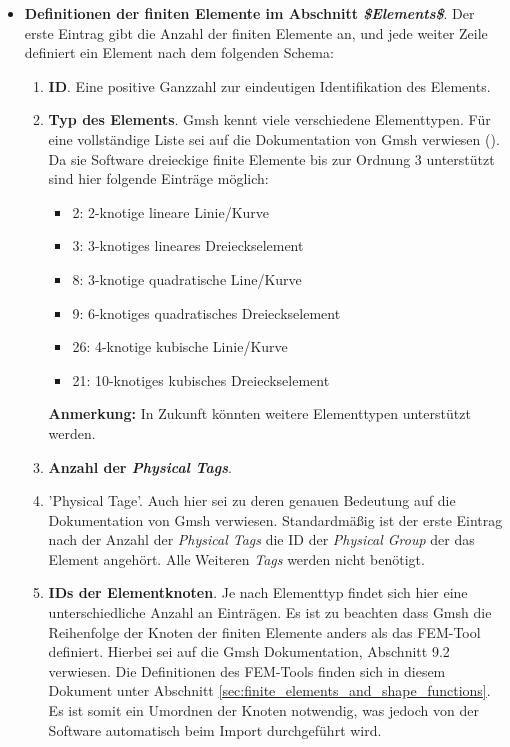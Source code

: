 \begin{itemize}
	\item \textbf{Definitionen der finiten Elemente im Abschnitt \textit{\$Elements\$}}. Der erste Eintrag gibt die Anzahl der finiten Elemente an, und jede weiter Zeile definiert ein Element nach dem folgenden Schema:
	\begin{enumerate}
		\item \textbf{ID}. Eine positive Ganzzahl zur eindeutigen Identifikation des Elements.
		\item \textbf{Typ des Elements}. Gmsh kennt viele verschiedene Elementtypen. Für eine vollständige Liste sei auf die Dokumentation von Gmsh verwiesen (\cite{gmsh_website}). Da sie Software dreieckige finite Elemente bis zur Ordnung 3 unterstützt sind hier folgende Einträge möglich:
		\begin{itemize}
			\item 2: 2-knotige lineare Linie/Kurve
			\item 3: 3-knotiges lineares Dreieckselement
			\item 8: 3-knotige quadratische Line/Kurve
			\item 9: 6-knotiges quadratisches Dreieckselement
			\item 26: 4-knotige kubische Linie/Kurve
			\item 21: 10-knotiges kubisches Dreieckselement
		\end{itemize}
		\textbf{Anmerkung:} In Zukunft könnten weitere Elementtypen unterstützt werden.
		\item \textbf{Anzahl der \textit{Physical Tags}}. 
		\item 'Physical Tage'. Auch hier sei zu deren genauen Bedeutung auf die Dokumentation von Gmsh \cite{gmsh_website} verwiesen. Standardmäßig ist der erste Eintrag nach der Anzahl der \textit{Physical Tags} die ID der \textit{Physical Group} der das Element angehört. Alle Weiteren \textit{Tags} werden nicht benötigt.
		\item \textbf{IDs der Elementknoten}. Je nach Elementtyp findet sich hier eine unterschiedliche Anzahl an Einträgen. Es ist zu beachten dass Gmsh die Reihenfolge der Knoten der finiten Elemente anders als das FEM-Tool definiert. Hierbei sei auf die Gmsh Dokumentation, Abschnitt 9.2 verwiesen. Die Definitionen des FEM-Tools finden sich in diesem Dokument unter Abschnitt \ref{sec:finite_elements_and_shape_functions}. Es ist somit ein Umordnen der Knoten notwendig, was jedoch von der Software automatisch beim Import durchgeführt wird.
	\end{enumerate}
\end{itemize}


